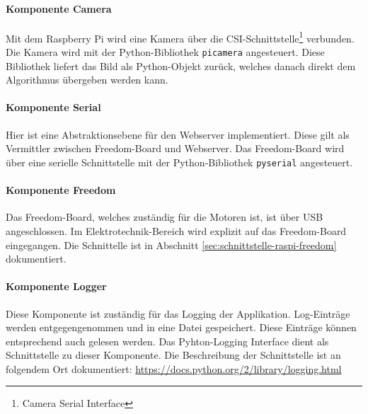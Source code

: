 \paragraph{Komponente Camera}
Mit dem Raspberry Pi wird eine Kamera über die CSI-Schnittstelle\footnote{Camera Serial Interface} verbunden. Die Kamera wird mit der Python-Bibliothek \texttt{picamera} angesteuert. Diese Bibliothek liefert das Bild als Python-Objekt zurück, welches danach direkt dem Algorithmus übergeben werden kann.

\paragraph{Komponente Serial}
Hier ist eine Abstraktionsebene für den Webserver implementiert. Diese gilt als Vermittler zwischen Freedom-Board und Webserver. Das Freedom-Board wird über eine serielle Schnittstelle mit der Python-Bibliothek \texttt{pyserial} angesteuert.

\paragraph{Komponente Freedom}
Das Freedom-Board, welches zuständig für die Motoren ist, ist über USB angeschlossen. Im Elektrotechnik-Bereich wird explizit auf das Freedom-Board eingegangen. Die Schnittelle ist in Abschnitt \ref{sec:schnittstelle-raspi-freedom} dokumentiert.

\paragraph{Komponente Logger}
Diese Komponente ist zuständig für das Logging der Applikation. Log-Einträge werden entgegengenommen und in eine Datei gespeichert. Diese Einträge können entsprechend auch gelesen werden. Das Pyhton-Logging Interface dient als Schnittstelle zu dieser Komponente. Die Beschreibung der Schnittstelle ist an folgendem Ort dokumentiert: \href{https://docs.python.org/2/library/logging.html}{https://docs.python.org/2/library/logging.html}
